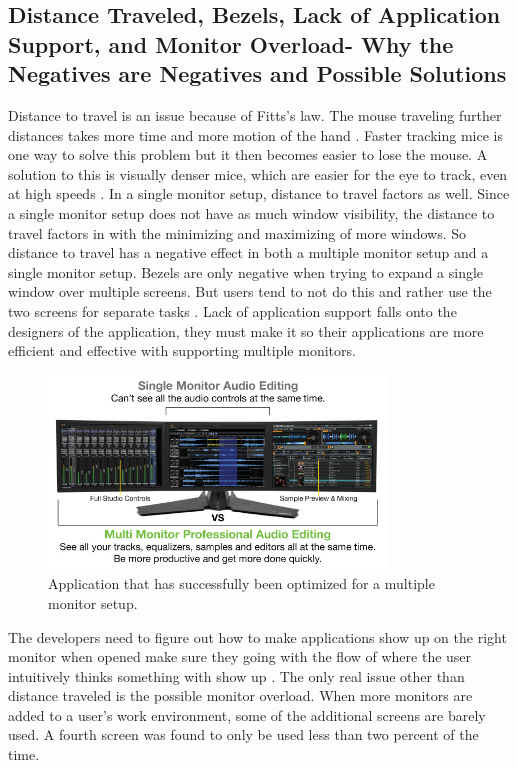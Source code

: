 \documentclass[a4paper]{article}
\begin{document}
\subsection{Distance Traveled, Bezels, Lack of Application Support, and Monitor Overload- Why the Negatives are Negatives and Possible Solutions}
Distance to travel is an issue because of Fitts's law. The mouse traveling further distances takes more time and more motion of the hand \cite{Tog}. Faster tracking mice is one way to solve this problem but it then becomes easier to lose the mouse. A solution to this is visually denser mice, which are easier for the eye to track, even at high speeds \cite{Truemper}. In a single monitor setup, distance to travel factors as well. Since a single monitor setup does not have as much window visibility, the distance to travel factors in with the minimizing and maximizing of more windows. So distance to travel has a negative effect in both a multiple monitor setup and a single monitor setup. Bezels are only negative when trying to expand a single window over multiple screens. But users tend to not do this and rather use the two screens for separate tasks \cite{Grudin}. Lack of application support falls onto the designers of the application, they must make it so their applications are more efficient and effective with supporting multiple monitors.
\begin{figure}[H]
\centering
\includegraphics[width=0.8\textwidth]{application-optimization.jpg}
\caption{Application that has successfully been optimized for a multiple monitor setup.}
\end{figure}
The developers need to figure out how to make applications show up on the right monitor when opened make sure they going with the flow of where the user intuitively thinks something with show up \cite{Grudin}. The only real issue other than distance traveled is the possible monitor overload. When more monitors are added to a user's work environment, some of the additional screens are barely used. A fourth screen was found to only be used less than two percent of the time.\cite{Truemper}
\end{document}

